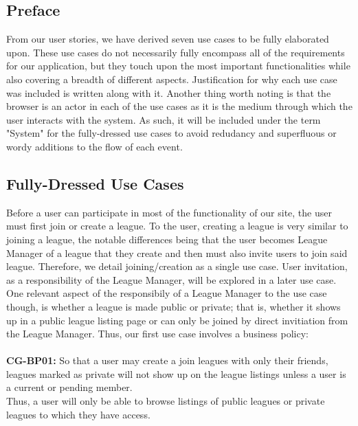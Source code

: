 \label{fdress}
\subsection{Preface}
From our user stories, we have derived seven use cases to be fully elaborated upon. These use cases do not necessarily fully encompass all of the requirements for our application, but they touch upon the most important functionalities while also covering a breadth of different aspects. Justification for why each use case was included is written along with it. Another thing worth noting is that the browser is an actor in each of the use cases as it is the medium through which the user interacts with the system. As such, it will be included under the term "System" for the fully-dressed use cases to avoid redudancy and superfluous or wordy additions to the flow of each event. \\

\subsection{Fully-Dressed Use Cases}
Before a user can participate in most of the functionality of our site, the user must first join or create a league. To the user, creating a league is very similar to joining a league, the notable differences being that the user becomes League Manager of a league that they create and then must also invite users to join said league. Therefore, we detail 
joining/creation as a single use case. User invitation, as a responsibility of the League Manager, will be explored in a later use case. One relevant aspect of the responsibily of a League Manager to the use case though, is whether a league is made public or private; that is, whether it shows up in a public league listing page or can only be joined by direct invitiation from the League Manager. Thus, our first use case involves a business policy: \\ \\
\textbf{CG-BP01:} So that a user may create a join leagues with only their friends, leagues marked as private will not show up on the league listings unless a user is a current or
pending member. \\

Thus, a user will only be able to browse listings of public leagues or private leagues to which they have access. \\


